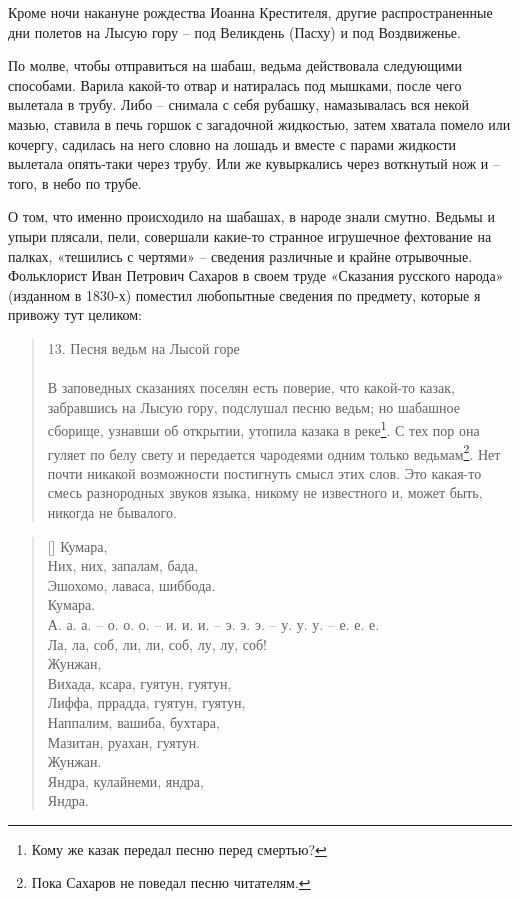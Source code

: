 
Кроме ночи накануне рождества Иоанна Крестителя, другие распространенные дни полетов на Лысую гору – под Великдень (Пасху) и под Воздвиженье.

По молве, чтобы отправиться на шабаш, ведьма действовала следующими способами. Варила какой-то отвар и натиралась под мышками, после чего вылетала в трубу. Либо – снимала с себя рубашку, намазывалась вся некой мазью, ставила в печь горшок с загадочной жидкостью, затем хватала помело или кочергу, садилась на него словно на лошадь и вместе с парами жидкости вылетала опять-таки через трубу. Или же кувыркались через воткнутый нож и – того, в небо по трубе.

О том, что именно происходило на шабашах, в народе знали смутно. Ведьмы и упыри плясали, пели, совершали какие-то странное игрушечное фехтование на палках, «тешились с чертями» – сведения различные и крайне отрывочные. Фольклорист Иван Петрович Сахаров в своем труде «Сказания русского народа» (изданном в 1830-х) поместил любопытные сведения по предмету, которые я привожу тут целиком:

\begin{quotation}
13. Песня ведьм на Лысой горе\\
\\
В заповедных сказаниях поселян есть поверие, что какой-то казак, забравшись на Лысую гору, подслушал песню ведьм; но шабашное сборище, узнавши об открытии, утопила казака в реке\footnote{Кому же казак передал песню перед смертью?}. С тех пор она гуляет по белу свету и передается чародеями одним только ведьмам\footnote{Пока Сахаров не поведал песню читателям.}. Нет почти никакой возможности постигнуть смысл этих слов. Это какая-то смесь разнородных звуков языка, никому не известного и, может быть, никогда не бывалого.
\end{quotation}

\settowidth{\versewidth}{А. а. а. – о. о. о. – и. и. и. – э. э. э. – у. у. у. – е. е. е.} 
\begin{verse}[\versewidth]
Кумара,\\
Них, них, запалам, бада,\\
Эшохомо, лаваса, шиббода.\\
Кумара.\\
А. а. а. – о. о. о. – и. и. и. – э. э. э. – у. у. у. – е. е. е.\\
Ла, ла, соб, ли, ли, соб, лу, лу, соб!\\
Жунжан,\\
Вихада, ксара, гуятун, гуятун,\\
Лиффа, пррадда, гуятун, гуятун, \\
Наппалим, вашиба, бухтара,\\
Мазитан, руахан, гуятун.\\
Жунжан.\\
Яндра, кулайнеми, яндра,\\
Яндра.
\end{verse}



